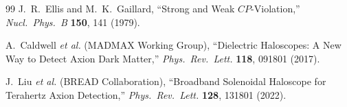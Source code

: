 \documentclass[11pt,a4paper]{article}
\begin{document}
\begin{thebibliography}{99}
J.~R.~Ellis and M.~K.~Gaillard, ``Strong and Weak $CP$-Violation,'' \emph{Nucl.\ Phys.\ B} \textbf{150}, 141 (1979).

A.~Caldwell \textit{et al.} (MADMAX Working Group), ``Dielectric Haloscopes: A New Way to Detect Axion Dark Matter,'' \emph{Phys.\ Rev.\ Lett.} \textbf{118}, 091801 (2017).

J.~Liu \textit{et al.} (BREAD Collaboration), ``Broadband Solenoidal Haloscope for Terahertz Axion Detection,'' \emph{Phys.\ Rev.\ Lett.} \textbf{128}, 131801 (2022).

\end{thebibliography}
\end{document}

